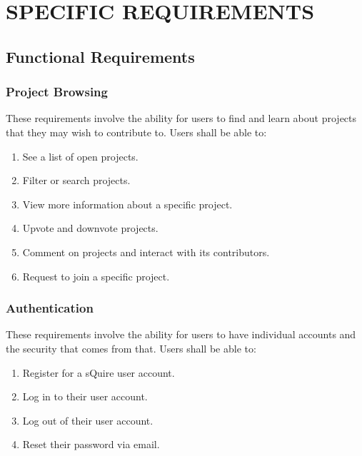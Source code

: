 \documentclass[twoside,letterpaper]{article}
\begin{document}
\clearpage\section[SPECIFIC REQUIREMENTS]{\rmfamily\bfseries\color{black} SPECIFIC REQUIREMENTS}
\hypertarget{RefHeading20459017292}{}{\color{black}

\subsection{Functional Requirements}

\subsubsection{Project Browsing}

These requirements involve the ability for users to find and learn about projects that they may wish to contribute to. Users shall be able to:

\begin{enumerate}
	\item See a list of open projects.
	\item Filter or search projects.
	\item View more information about a specific project.
	\item Upvote and downvote projects.
	\item Comment on projects and interact with its contributors.
	\item Request to join a specific project.
\end{enumerate}

\subsubsection{Authentication}

These requirements involve the ability for users to have individual accounts and the security that comes from that. Users shall be able to:

\begin{enumerate}
	\item Register for a sQuire user account.
	\item Log in to their user account.
	\item Log out of their user account.
	\item Reset their password via email.
\end{enumerate}

}
\end{document}
